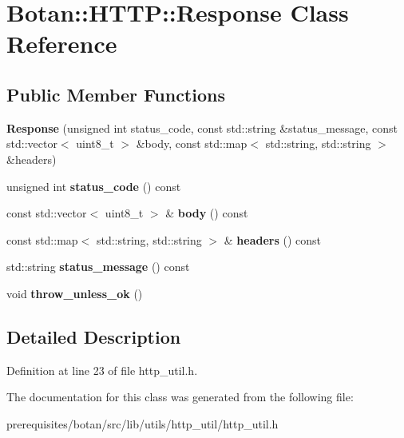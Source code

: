 \hypertarget{class_botan_1_1_h_t_t_p_1_1_response}{}\section{Botan\+:\+:H\+T\+TP\+:\+:Response Class Reference}
\label{class_botan_1_1_h_t_t_p_1_1_response}
\subsection*{Public Member Functions}
\begin{DoxyCompactItemize}
\item 
\mbox{\label{class_botan_1_1_h_t_t_p_1_1_response_ab2be529015e249d8909c10b0832ce8fe}} 
{\bfseries Response} (unsigned int status\+\_\+code, const std\+::string \&status\+\_\+message, const std\+::vector$<$ uint8\+\_\+t $>$ \&body, const std\+::map$<$ std\+::string, std\+::string $>$ \&headers)
\item 
\mbox{\label{class_botan_1_1_h_t_t_p_1_1_response_acb36408653d267e7254d5a00123c1498}} 
unsigned int {\bfseries status\+\_\+code} () const
\item 
\mbox{\label{class_botan_1_1_h_t_t_p_1_1_response_a1817e37c21dc13da97083ce1e8dc8db8}} 
const std\+::vector$<$ uint8\+\_\+t $>$ \& {\bfseries body} () const
\item 
\mbox{\label{class_botan_1_1_h_t_t_p_1_1_response_a3d19bcef9beca56286220316a3bde542}} 
const std\+::map$<$ std\+::string, std\+::string $>$ \& {\bfseries headers} () const
\item 
\mbox{\label{class_botan_1_1_h_t_t_p_1_1_response_ae5dc47c5f3f292a73722b8198f6b358a}} 
std\+::string {\bfseries status\+\_\+message} () const
\item 
\mbox{\label{class_botan_1_1_h_t_t_p_1_1_response_a3c4157d49499a3d25e112592a585490f}} 
void {\bfseries throw\+\_\+unless\+\_\+ok} ()
\end{DoxyCompactItemize}


\subsection{Detailed Description}


Definition at line 23 of file http\+\_\+util.\+h.



The documentation for this class was generated from the following file\+:\begin{DoxyCompactItemize}
\item 
prerequisites/botan/src/lib/utils/http\+\_\+util/http\+\_\+util.\+h\end{DoxyCompactItemize}
